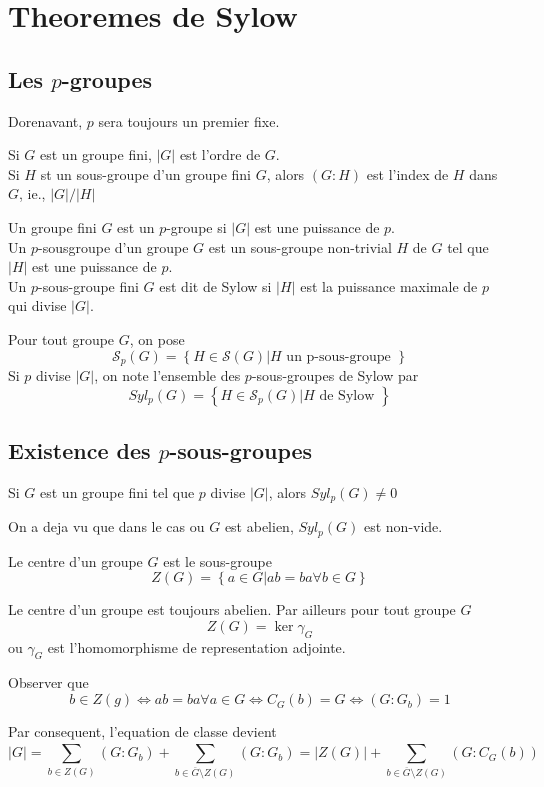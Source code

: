 \documentclass[../main.tex]{subfiles}
\begin{document}
\section{Theoremes de Sylow}
\subsection{Les $p$-groupes}
Dorenavant, $p$ sera toujours un premier fixe.\\
\begin{defn}
Si $G$ est un groupe fini, $|G|$ est l'ordre de $G$.\\
Si $H$ st un sous-groupe d'un groupe fini $G$, alors $( G:H) $ est l'index de $H$ dans $G$, ie., $|G|/|H|$ 
\end{defn}
\begin{defn}[p-groupes]
	Un groupe fini $G$ est un $p$-groupe si $|G|$ est une puissance de $p$.\\
	Un $p$-sousgroupe d'un groupe $G$ est un sous-groupe non-trivial $H$ de $G$ tel que $|H|$ est une puissance de $p$.\\
	Un $p$-sous-groupe fini $G$ est dit de Sylow si $|H|$ est la puissance maximale de $p$ qui divise $|G|$.
\end{defn}
\begin{defn}
Pour tout groupe $G$, on pose
\[ 
\mathcal{S}_p( G) = \left\{ H\in \mathcal{S}( G) | H \text{ un p-sous-groupe }  \right\} 
\]
Si $p$ divise $|G|$, on note l'ensemble des $p$-sous-groupes de Sylow par
\[ 
Syl_p( G) = \left\{ H \in \mathcal{S}_p( G) | H \text{ de Sylow }  \right\} 
\]

\end{defn}
\subsection{Existence des $p$-sous-groupes}
\begin{thm}
	Si $G$ est un groupe fini tel que $p$ divise $|G|$, alors $Syl_p( G) \neq 0$ 
\end{thm}
On a deja vu que dans le cas ou $G$ est abelien, $Syl_p( G) $ est non-vide.
\begin{defn}
	Le centre d'un groupe $G$ est le sous-groupe
	\[ 
	Z( G) = \left\{ a\in G| ab = ba \forall b \in G \right\} 
	\]

\end{defn}
\begin{rmq}
Le centre d'un groupe est toujours abelien. Par ailleurs pour tout groupe $G$ 
\[ 
Z( G) = \ker \gamma_G
\]
ou $\gamma_G$ est l'homomorphisme de representation adjointe.
\end{rmq}
Observer que 
\[ 
b\in Z( g) \iff ab = ba \forall a\in G \iff C_G( b) = G \iff ( G:G_b) = 1
\]

Par consequent, l'equation de classe devient
\[ 
|G| = \sum_{b \in Z( G) }^{ } ( G:G_b) + \sum_{b \in \overline{G}\setminus Z( G) }^{ }( G:G_b)  = |Z( G) | + \sum_{b\in \overline{G}\setminus Z( G) }^{ } ( G:C_G( b) ) 	
\]
\end{document}
